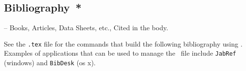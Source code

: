 \subsection*{Bibliography{\color{red}\ *}}
-- Books, Articles, Data Sheets, etc., Cited in the body. 

See the \verb|.tex| file for the commands that build the following bibliography using \BibTeX. Examples of applications that can be used to manage the \BibTeX\  file include \verb|JabRef| (windows) and \verb|BibDesk| (os x).
